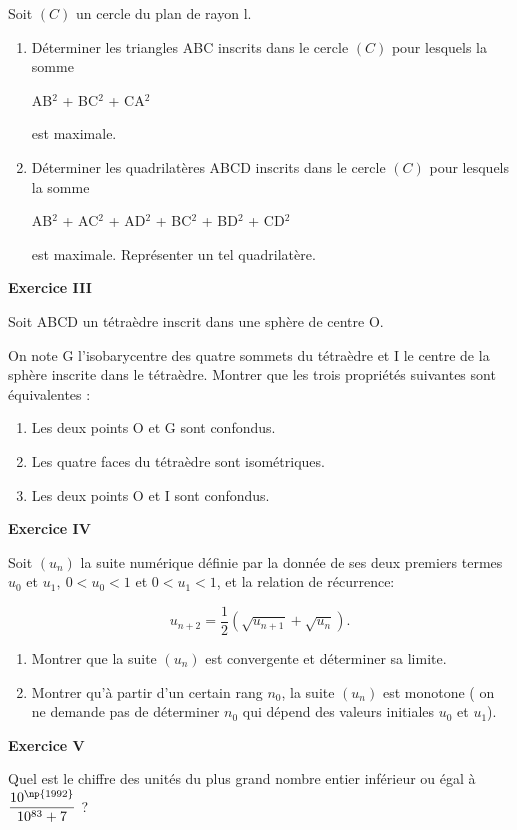 \documentclass[a4paper,11pt]{article}
\begin{document}
Soit $(C)$ un cercle du plan de rayon l.

\medskip

\begin{enumerate}
\item Déterminer les triangles ABC inscrits dans le cercle $(C)$ pour lesquels la somme

\begin{center}AB$^2$ + BC$^2$ + CA$^2$ \end{center}
est maximale.
\item Déterminer les quadrilatères ABCD inscrits dans le cercle $(C)$ pour lesquels la somme

\begin{center}AB$^2$ + AC$^2$ + AD$^2$ + BC$^2$ + BD$^2$ + CD$^2$ \end{center}

est maximale. Représenter un tel quadrilatère.
\end{enumerate}

\begin{center}\textbf{{\color{blue} Exercice III}}
\end{center}


Soit ABCD un tétraèdre inscrit dans une sphère de centre O. 

On note G l'isobarycentre des quatre sommets du tétraèdre et I le centre de la sphère inscrite dans le tétraèdre. Montrer que les trois propriétés suivantes sont équivalentes :

\medskip

\begin{enumerate}
\item Les deux points O et G sont confondus.
\item Les quatre faces du tétraèdre sont isométriques. 
\item Les deux points O et I sont confondus.
\end{enumerate}

\begin{center}\textbf{{\color{blue} Exercice IV}}
\end{center}


Soit $\left(u_n\right)$ la suite numérique définie par la donnée de ses deux premiers termes $u_0$ et $u_1,\: 0 < u_0 < 1$ et $0 < u_1 < 1$, et la relation de récurrence:

\[u_{n+2} = \dfrac12 \left(\sqrt{u_{n+1}} + \sqrt{u_n}\right).\]

\begin{enumerate}
\item Montrer que la suite $\left(u_n\right)$ est convergente et déterminer sa limite.
\item Montrer qu'à partir d'un certain rang $n_0$, la suite $\left(u_n\right)$ est monotone ( on ne demande pas de déterminer $n_0$ qui dépend des valeurs initiales $u_0$ et $u_1$).
\end{enumerate}

\begin{center}\textbf{{\color{blue} Exercice V}}
\end{center}

Quel est le chiffre des unités du plus grand nombre entier inférieur ou égal à 
$\dfrac{10^{\np{1992}}}{10^{83} + 7}$ ?
\end{document}
